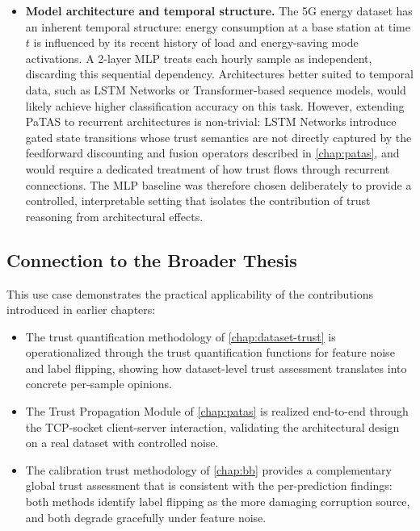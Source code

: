 \begin{itemize}
    \item \textbf{Model architecture and temporal structure.} The 5G energy dataset has an inherent temporal structure: energy consumption at a base station at time $t$ is influenced by its recent history of load and energy-saving mode activations. A 2-layer \ac{MLP} treats each hourly sample as independent, discarding this sequential dependency. Architectures better suited to temporal data, such as \ac{LSTM} Networks or Transformer-based sequence models, would likely achieve higher classification accuracy on this task. However, extending \ac{PaTAS} to recurrent architectures is non-trivial: \ac{LSTM} Networks introduce gated state transitions whose trust semantics are not directly captured by the feedforward discounting and fusion operators described in \cref{chap:patas}, and would require a dedicated treatment of how trust flows through recurrent connections. The 
    \ac{MLP} baseline was therefore chosen deliberately to provide a controlled, interpretable setting that isolates the contribution of trust reasoning from architectural effects.
\end{itemize}


\subsection{Connection to the Broader Thesis}
\label{sec:discussion_thesis}

This use case demonstrates the practical applicability of the contributions introduced in earlier chapters:

\begin{itemize}
    \item The trust quantification methodology of \cref{chap:dataset-trust} is operationalized through the trust quantification functions for feature noise and label flipping, showing how dataset-level trust assessment translates into concrete per-sample opinions.
    \item The Trust Propagation Module of \cref{chap:patas} is realized end-to-end through the \ac{TCP}-socket client-server interaction, validating the architectural design on a real dataset with controlled noise.
    \item The calibration trust methodology of \cref{chap:bb} provides a complementary global trust assessment that is consistent with the per-prediction findings: both methods identify label flipping as the more damaging corruption source, and both degrade gracefully under feature noise.
\end{itemize}

